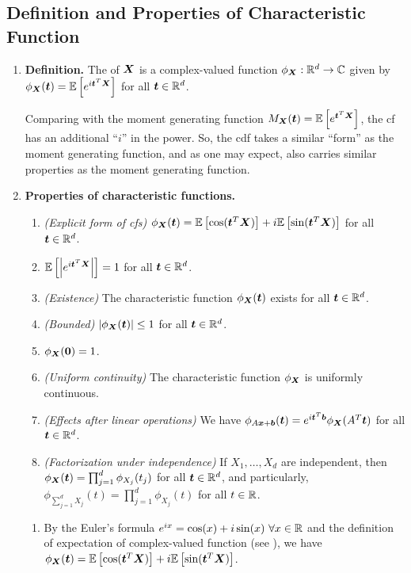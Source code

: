 \subsection{Definition and Properties of Characteristic Function}
\label{subsect:cf-def-prop}
\begin{enumerate}
\item \textbf{Definition.} The  of \(\bm{X}\)
is a complex-valued function \(\phi_{\bm{X}}:\mathbb{R}^{d}\to\mathbb{C}\) given by
\(\phi_{\bm{X}}(\bm{t})=\mathbb{E}\left[e^{i\bm{t}^{T}\bm{X}}\right]\) for all
\(\bm{t}\in\mathbb{R}^{d}\).

Comparing with the moment generating function \(M_{\bm{X}}(\bm{t})
=\mathbb{E}\left[e^{\bm{t}^{T}\bm{X}}\right]\), the cf has an additional ``\(i\)'' in the
power. So, the cdf takes a similar ``form'' as the moment generating function,
and as one may expect, also carries similar properties as the moment generating
function.
\item\label{it:cf-prop} \textbf{Properties of characteristic functions.}
\begin{enumerate}
\item \emph{(Explicit form of cfs)}
\(\phi_{\bm{X}}(\bm{t})=\mathbb{E}\left[\cos(\bm{t}^{T}\bm{X})\right]
+i\mathbb{E}\left[\sin(\bm{t}^{T}\bm{X})\right]\) for all \(\bm{t}\in\mathbb{R}^{d}\).
\item 
\(\mathbb{E}\left[\left|e^{i\bm{t}^{T}\bm{X}}\right|\right]=1\) for all
\(\bm{t}\in\mathbb{R}^{d}\).
\item \emph{(Existence)} The characteristic function
\(\phi_{\bm{X}}(\bm{t})\) exists for all \(\bm{t}\in\mathbb{R}^{d}\).
\item \emph{(Bounded)} \(|\phi_{\bm{X}}(\bm{t})|\le 1\) for all
\(\bm{t}\in\mathbb{R}^{d}\).
\item \(\phi_{\bm{X}}(\bm{0})=1\).
\item\label{it:cf-unif-cts} \emph{(Uniform continuity)} The characteristic function
\(\phi_{\bm{X}}\) is uniformly continuous.
\item \emph{(Effects after linear operations)}
We have \(\phi_{A\bm{x}+\bm{b}}(\bm{t})=e^{i\bm{t}^{T}\bm{b}}
\phi_{\bm{X}}(A^{T}\bm{t})\) for all \(\bm{t}\in\mathbb{R}^{d}\).
\item \emph{(Factorization under independence)} If \(X_1,\dotsc,X_d\) are
independent, then \(\phi_{\bm{X}}(\bm{t})=\prod_{j=1}^{d}\phi_{X_j}(t_j)\)
for all \(\bm{t}\in\mathbb{R}^{d}\), and particularly,
\(\phi_{\sum_{j=1}^{d}X_j}(t)=\prod_{j=1}^{d}\phi_{X_j}(t)\) for all \(t\in\mathbb{R}\).
\end{enumerate}
\begin{pf}
\begin{enumerate}
\item By the Euler's formula \(e^{ix}=\cos(x)+i\sin(x)~\forall x\in\mathbb{R}\) and
the definition of expectation of complex-valued function (see
), we have
\(\phi_{\bm{X}}(\bm{t})=\mathbb{E}\left[\cos(\bm{t}^{T}\bm{X})\right]
+i\mathbb{E}\left[\sin(\bm{t}^{T}\bm{X})\right]\).


\end{enumerate}
\end{pf}
\end{enumerate}
